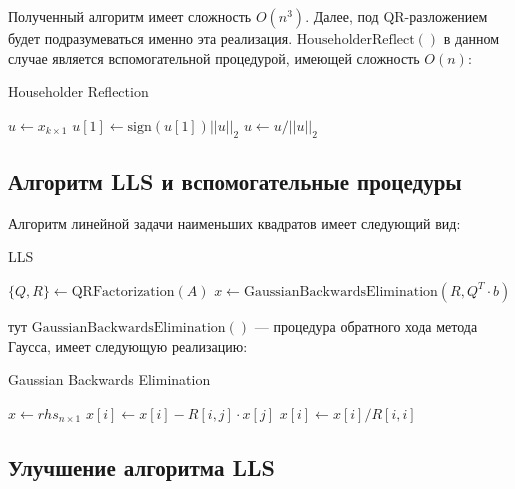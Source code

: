 \documentclass[a4paper,14pt]{extarticle}
\begin{document}
\noindent Полученный алгоритм имеет сложность $O(n^3)$. Далее, под QR-разложением будет подразумеваться именно эта реализация. $\mathrm{HouseholderReflect()}$ в данном случае является вспомогательной процедурой, имеющей сложность $O(n)$:

\vspace{8pt}
\begin{algorithm}[H]
\caption{Householder Reflection}
\vspace{4pt}
$u \gets x_{k \times 1}$\;
$u[1] \gets \mathrm{sign}(u[1]) ||u||_2$\;
$u \gets u / ||u||_2$\;
\end{algorithm}
\vspace{8pt}

\subsection{Алгоритм LLS и вспомогательные процедуры}

Алгоритм линейной задачи наименьших квадратов имеет следующий вид:

\vspace{8pt}
\begin{algorithm}[H]
\caption{LLS}
\vspace{4pt}
$\lbrace Q, R \rbrace \gets \mathrm{QRFactorization}(A)$\;
$x \gets \mathrm{GaussianBackwardsElimination}(R, Q^T \cdot b)$\;
\end{algorithm}
\vspace{8pt}

\noindent тут $\mathrm{GaussianBackwardsElimination()}$ --- процедура обратного хода метода Гаусса, имеет следующую реализацию:

\begin{algorithm}[H]
\caption{Gaussian Backwards Elimination}
\vspace{4pt}
$x \gets rhs_{n \times 1}$\;
 {
	 {
		$x[i] \gets x[i] - R[i, j] \cdot x[j]$\;
	}
	$x[i] \gets x[i] / R[i, i]$\;
}
\end{algorithm}
\vspace{8pt}

\subsection{Улучшение алгоритма LLS}
\end{document}

